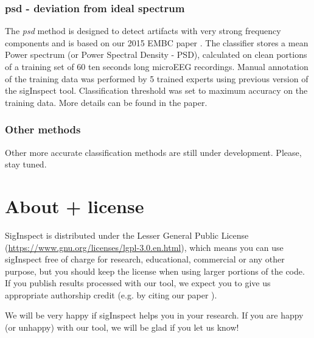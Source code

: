 \documentclass[a4paper,10pt]{article}
\begin{document}
\subsubsection{psd - deviation from ideal spectrum}
The \emph{psd} method is designed to detect artifacts with very strong frequency components and is based on our 2015 EMBC paper \cite{Bakstein2015}. The classifier stores a mean Power spectrum (or Power Spectral Density - PSD), calculated on clean portions of a training set of 60 ten seconds long microEEG recordings. Manual annotation of the training data was performed by 5 trained experts using previous version of the sigInspect tool. Classification threshold was set to maximum accuracy on the training data. More details can be found in the paper.

\subsubsection{Other methods}
Other more accurate classification methods are still under development. Please, stay tuned.

\section{About + license}
SigInspect is distributed under the Lesser General Public License (\url{https://www.gnu.org/licenses/lgpl-3.0.en.html}), which means you can use sigInspect free of charge for research, educational, commercial or any other purpose, but you should keep the license when using larger portions of the code. If you publish results processed with our tool, we expect you to give us appropriate authorship credit (e.g. by citing our paper \cite{Bakstein2015}). 

We will be very happy if sigInspect helps you in your research. If you are happy (or unhappy) with our tool, we will be glad if you let us know!
\end{document}
